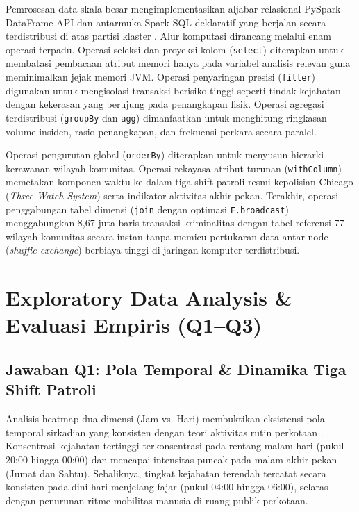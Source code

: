\documentclass[11pt,a4paper]{article}
\begin{document}
Pemrosesan data skala besar mengimplementasikan aljabar relasional PySpark DataFrame API dan antarmuka Spark SQL deklaratif yang berjalan secara terdistribusi di atas partisi klaster \cite{zaharia2012}. Alur komputasi dirancang melalui enam operasi terpadu. Operasi seleksi dan proyeksi kolom (\texttt{select}) diterapkan untuk membatasi pembacaan atribut memori hanya pada variabel analisis relevan guna meminimalkan jejak memori JVM. Operasi penyaringan presisi (\texttt{filter}) digunakan untuk mengisolasi transaksi berisiko tinggi seperti tindak kejahatan dengan kekerasan yang berujung pada penangkapan fisik. Operasi agregasi terdistribusi (\texttt{groupBy} dan \texttt{agg}) dimanfaatkan untuk menghitung ringkasan volume insiden, rasio penangkapan, dan frekuensi perkara secara paralel. 

Operasi pengurutan global (\texttt{orderBy}) diterapkan untuk menyusun hierarki kerawanan wilayah komunitas. Operasi rekayasa atribut turunan (\texttt{withColumn}) memetakan komponen waktu ke dalam tiga shift patroli resmi kepolisian Chicago (\textit{Three-Watch System}) serta indikator aktivitas akhir pekan. Terakhir, operasi penggabungan tabel dimensi (\texttt{join} dengan optimasi \texttt{F.broadcast}) menggabungkan 8,67 juta baris transaksi kriminalitas dengan tabel referensi 77 wilayah komunitas secara instan tanpa memicu pertukaran data antar-node (\textit{shuffle exchange}) berbiaya tinggi di jaringan komputer terdistribusi.

\section{Exploratory Data Analysis \& Evaluasi Empiris (Q1--Q3)}

\subsection{Jawaban Q1: Pola Temporal \& Dinamika Tiga Shift Patroli}
Analisis heatmap dua dimensi (Jam vs. Hari) membuktikan eksistensi pola temporal sirkadian yang konsisten dengan teori aktivitas rutin perkotaan \cite{towers2018, stec2018}. Konsentrasi kejahatan tertinggi terkonsentrasi pada rentang malam hari (pukul 20:00 hingga 00:00) dan mencapai intensitas puncak pada malam akhir pekan (Jumat dan Sabtu). Sebaliknya, tingkat kejahatan terendah tercatat secara konsisten pada dini hari menjelang fajar (pukul 04:00 hingga 06:00), selaras dengan penurunan ritme mobilitas manusia di ruang publik perkotaan.
\end{document}
